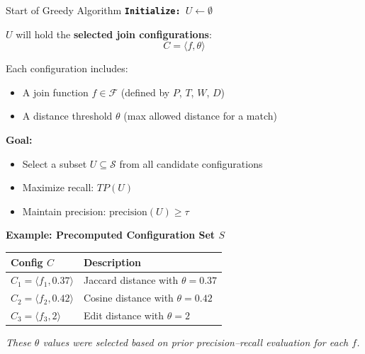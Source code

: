 \documentclass[8pt]{beamer} %
\begin{document}
\begin{frame}{Start of Greedy Algorithm}
	\texttt{\textbf{Initialize:} $U \leftarrow \emptyset$}
	
	\vspace{1em}
	$U$ will hold the \textbf{selected join configurations}:
	$$
	C = \langle f, \theta \rangle
	$$
	
	Each configuration includes:
	\begin{itemize}
		\item A join function $f \in \mathcal{F}$ (defined by $P$, $T$, $W$, $D$)
		\item A distance threshold $\theta$ (max allowed distance for a match)
	\end{itemize}
	
	\vspace{0.5em}
	\textbf{Goal:}
	\begin{itemize}
		\item Select a subset $U \subseteq \mathcal{S}$ from all candidate configurations
		\item Maximize recall: $TP(U)$
		\item Maintain precision: $\text{precision}(U) \geq \tau$
	\end{itemize}
	
	\vspace{0.5em}
	\textbf{Example: Precomputed Configuration Set $S$}
	\begin{tabular}{ll}
		\textbf{Config $C$} & \textbf{Description} \\
		\hline
		$C_1 = \langle f_1, 0.37 \rangle$ & Jaccard distance with $\theta = 0.37$ \\
		$C_2 = \langle f_2, 0.42 \rangle$ & Cosine distance with $\theta = 0.42$ \\
		$C_3 = \langle f_3, 2 \rangle$    & Edit distance with $\theta = 2$ \\
	\end{tabular}
	
	\vspace{0.5em}
	\textit{These $\theta$ values were selected based on prior precision–recall evaluation for each $f$.}
\end{frame}
\end{document}
